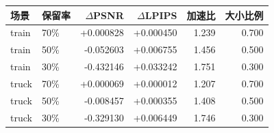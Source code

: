 \begin{center}
\small
\begin{tabular}{llrrrr}
\toprule
场景 & 保留率 & $\Delta$PSNR & $\Delta$LPIPS & 加速比 & 大小比例 \\
\midrule
train & 70\% & +0.000828 & +0.000450 & 1.239 & 0.700 \\
train & 50\% & -0.052603 & +0.006755 & 1.456 & 0.500 \\
train & 30\% & -0.432146 & +0.033242 & 1.751 & 0.300 \\
truck & 70\% & +0.000069 & +0.000012 & 1.207 & 0.700 \\
truck & 50\% & -0.008457 & +0.000355 & 1.408 & 0.500 \\
truck & 30\% & -0.329130 & +0.006449 & 1.746 & 0.300 \\
\bottomrule
\end{tabular}
\end{center}
